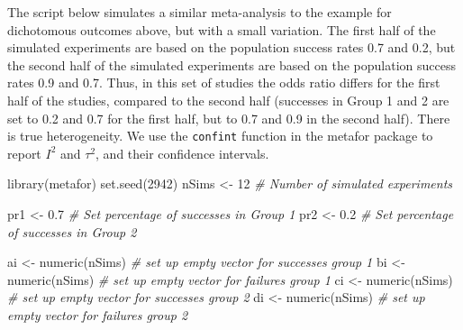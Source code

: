 \documentclass[
  oneside]{book}
\newenvironment{Shaded}{\begin{snugshade}}{\end{snugshade}}
\newcommand{\CommentTok}[1]{\textcolor[rgb]{0.56,0.35,0.01}{\textit{#1}}}
\newcommand{\DecValTok}[1]{\textcolor[rgb]{0.00,0.00,0.81}{#1}}
\newcommand{\FloatTok}[1]{\textcolor[rgb]{0.00,0.00,0.81}{#1}}
\newcommand{\FunctionTok}[1]{\textcolor[rgb]{0.00,0.00,0.00}{#1}}
\newcommand{\NormalTok}[1]{#1}
\newcommand{\OtherTok}[1]{\textcolor[rgb]{0.56,0.35,0.01}{#1}}
\begin{document}
The script below simulates a similar meta-analysis to the example for dichotomous outcomes above, but with a small variation. The first half of the simulated experiments are based on the population success rates 0.7 and 0.2, but the second half of the simulated experiments are based on the population success rates 0.9 and 0.7. Thus, in this set of studies the odds ratio differs for the first half of the studies, compared to the second half (successes in Group 1 and 2 are set to 0.2 and 0.7 for the first half, but to 0.7 and 0.9 in the second half). There is true heterogeneity. We use the \texttt{confint} function in the metafor package to report \(I^2\) and \(\tau^2\), and their confidence intervals.

\begin{Shaded}
\begin{Highlighting}[]
\FunctionTok{library}\NormalTok{(metafor)}
\FunctionTok{set.seed}\NormalTok{(}\DecValTok{2942}\NormalTok{)}
\NormalTok{nSims }\OtherTok{\textless{}{-}} \DecValTok{12} \CommentTok{\# Number of simulated experiments}

\NormalTok{pr1 }\OtherTok{\textless{}{-}} \FloatTok{0.7} \CommentTok{\# Set percentage of successes in Group 1}
\NormalTok{pr2 }\OtherTok{\textless{}{-}} \FloatTok{0.2} \CommentTok{\# Set percentage of successes in Group 2}

\NormalTok{ai }\OtherTok{\textless{}{-}} \FunctionTok{numeric}\NormalTok{(nSims) }\CommentTok{\# set up empty vector for successes group 1}
\NormalTok{bi }\OtherTok{\textless{}{-}} \FunctionTok{numeric}\NormalTok{(nSims) }\CommentTok{\# set up empty vector for failures group 1}
\NormalTok{ci }\OtherTok{\textless{}{-}} \FunctionTok{numeric}\NormalTok{(nSims) }\CommentTok{\# set up empty vector for successes group 2}
\NormalTok{di }\OtherTok{\textless{}{-}} \FunctionTok{numeric}\NormalTok{(nSims) }\CommentTok{\# set up empty vector for failures group 2}


\end{Highlighting}
\end{Shaded}
\end{document}

